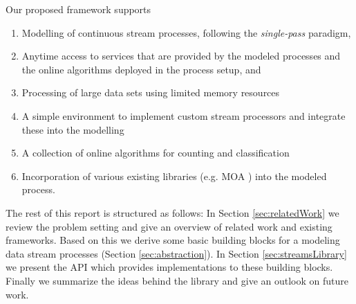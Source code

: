 Our proposed framework supports
\begin{enumerate}
\item Modelling of continuous stream processes, following the {\em
    single-pass} paradigm,
\item Anytime access to services that are provided by the modeled
  processes and the online algorithms deployed in the process setup,
  and
\item Processing of large data sets using limited memory resources
\item A simple environment to implement custom stream processors and
  integrate these into the modelling
\item A collection of online algorithms for counting and classification
\item Incorporation of various existing libraries (e.g. MOA
  \cite{moa}) into the modeled process.
\end{enumerate}

The rest of this report is structured as follows: In Section
\ref{sec:relatedWork} we review the problem setting and give an
overview of related work and existing frameworks.
Based on this we derive some basic building blocks for a modeling data
stream processes (Section \ref{sec:abstraction}). In Section
\ref{sec:streamsLibrary} we present the \streams API which provides
implementations to these building blocks. Finally we summarize the
ideas behind the \streams library and give an outlook on future work.
